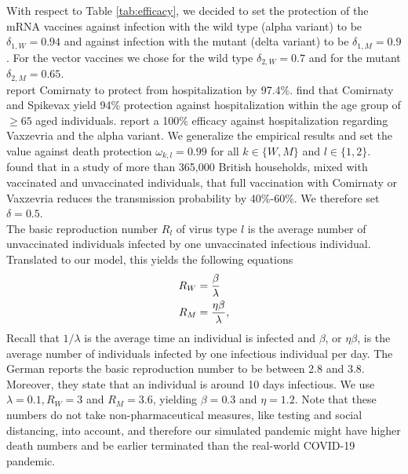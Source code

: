 With respect to Table \ref{tab:efficacy}, we decided to set the protection of the mRNA vaccines against infection with the wild type (alpha variant) to be $\delta_{1, W} = 0.94$ and against infection with the mutant (delta variant) to be $\delta_{1, M} = 0.9$. For the vector vaccines we chose for the wild type $\delta_{2, W} = 0.7$ and for the mutant $\delta_{2, M} = 0.65$.\\

\cite{Abu.2021} report Comirnaty to protect from hospitalization by 97.4\%. \cite{Tenforde.2021} find that Comirnaty and Spikevax yield 94\% protection against hospitalization within the age group of $\geq 65$ aged individuals. \cite{Voysey.2021} report a 100\% efficacy against hospitalization regarding Vaxzevria and the alpha variant. We generalize the empirical results and set the value against death protection $\omega_{k,l} = 0.99$ for all $k \in \{W,M\}$ and $l \in \{1,2\}$.\\

\cite{Harris.2021} found that in a study of more than 365,000 British households, mixed with vaccinated and unvaccinated individuals, that full vaccination with Comirnaty or Vaxzevria reduces the transmission probability by 40\%-60\%. We therefore set $\delta = 0.5$. \\

The basic reproduction number $R_l$ of virus type $l$ is the average number of unvaccinated individuals infected by one unvaccinated infectious individual. Translated to our model, this yields the following equations 
\begin{align}
R_W &= \frac{\beta}{\lambda} \\
R_M &= \frac{\eta \beta}{\lambda}, \notag
\end{align}
Recall that $1/\lambda$ is the average time an individual is infected and $\beta$, or $\eta \beta$, is the average number of individuals infected by one infectious individual per day. The German \cite{RKI.2021} reports the basic reproduction number to be between 2.8 and 3.8. Moreover, they state that an individual is around 10 days infectious. We use $\lambda = 0.1, R_W = 3$ and $R_M = 3.6$, yielding $\beta = 0.3$ and $\eta = 1.2$. Note that these numbers do not take non-pharmaceutical measures, like testing and social distancing, into account, and therefore our simulated pandemic might have higher death numbers and be earlier terminated than the real-world COVID-19 pandemic. \\%

